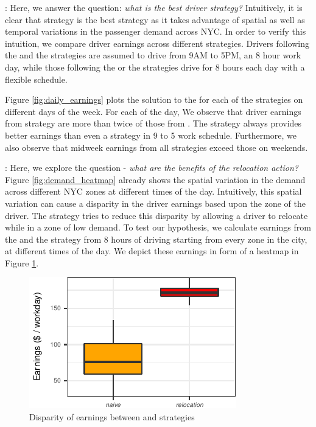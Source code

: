 : Here, we answer the question: \textit{what is the best driver strategy?} Intuitively, it is clear that {\relocationflexible} strategy is the best strategy as it takes advantage of spatial as well as temporal variations in the passenger demand across NYC. In order to verify this intuition, we compare driver earnings across different strategies. Drivers following the {\naive} and the {\relocation} strategies are assumed to drive from 9AM to 5PM, an 8 hour work day, while those following the {\flexible} or the {\relocationflexible} strategies drive for 8 hours each day with a flexible schedule.

Figure \ref{fig:daily_earnings} plots the solution to the {\originalproblem} for each of the strategies on different days of the week. For each of the day, We observe that driver earnings from {\relocationflexible} strategy are more than twice of those from {\naive}. The {\flexible} strategy always provides better earnings than even a {\relocation} strategy in 9 to 5 work schedule. Furthermore, we also observe that midweek earnings from all strategies exceed those on weekends.

: Here, we explore the question - \textit{what are the benefits of the relocation action?} Figure \ref{fig:demand_heatmap} already shows the spatial variation in the demand across different NYC zones at different times of the day. Intuitively, this spatial variation can cause a disparity in the driver earnings based upon the zone of the driver. The {\relocation} strategy tries to reduce this disparity by allowing a driver to relocate while in a zone of low demand. To test our hypothesis, we calculate earnings from the {\naive} and the {\relocation} strategy from 8 hours of driving starting from every zone in the city, at different times of the day. We depict these earnings in form of a heatmap in Figure \ref{fig:earnings_heatmap}.

\begin{figure}
	\includegraphics{figures/earnings_heatmap.pdf}
	\caption{Disparity of earnings between {\naive} and {\relocation} strategies}
	\label{fig:earnings_heatmap}
\end{figure}

